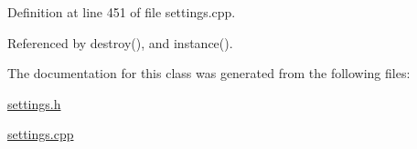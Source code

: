 Definition at line 451 of file settings.cpp.

Referenced by destroy(), and instance().

The documentation for this class was generated from the following files:\begin{CompactItemize}
\item 
\hyperlink{settings_8h}{settings.h}\item 
\hyperlink{settings_8cpp}{settings.cpp}\end{CompactItemize}
